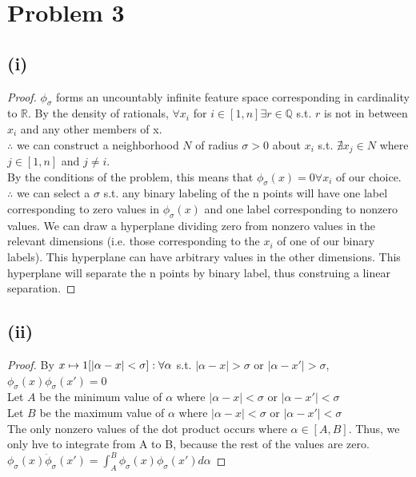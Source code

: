 \documentclass[twoside,11pt]{homework}
\begin{document}
\section*{Problem 3}
\subsection*{(i)}
	\begin{proof}
		$\phi_\sigma$ forms an uncountably infinite feature space corresponding in cardinality to $\mathbb{R}$.
		By the density of rationals, $\forall x_i$ for $i \in [1,n] \exists r \in \mathbb{Q}$
		s.t. $r$ is not in between $x_i$ and any other members of x. \\
		$\therefore$ we can construct a neighborhood $N$ of radius $\sigma > 0$ about $x_i$
		s.t. $\nexists x_j \in N$ where $j \in [1, n]$ and $j \neq i$. \\
		By the conditions of the problem, this means that $\phi_\sigma (x) = 0 \forall x_i$ of our choice. \\
		$\therefore$ we can select a $\sigma$ s.t. any binary labeling of the n points will have one label corresponding to zero values in $\phi_\sigma(x)$ and one label corresponding to nonzero values. We can draw a hyperplane dividing zero from nonzero values in the relevant dimensions (i.e. those corresponding to the $x_i$ of one of our binary labels). This hyperplane can have arbitrary values in the other dimensions. This hyperplane will separate the n points by binary label, thus construing a linear separation.
	\end{proof}

\subsection*{(ii)}
	\begin{proof}
		By $x \mapsto 1[|\alpha-x| < \sigma]:\\
		\forall \alpha$ s.t. $|\alpha - x| > \sigma $ or $|\alpha - x'| > \sigma$, $\phi_\sigma(x) \phi_\sigma(x') = 0$\\
		Let $A$ be the minimum value of $\alpha$ where $|\alpha - x| < \sigma $ or $|\alpha - x'| < \sigma$\\
		Let $B$ be the maximum value of $\alpha$ where $|\alpha - x| < \sigma $ or $|\alpha - x'| < \sigma$\\
		The only nonzero values of the dot product occurs where $\alpha \in [A, B]$.  Thus, we only hve to integrate from A to B, because the rest of the values are zero.\\
		$\phi_\sigma(x) \dot \phi_\sigma(x') = \int_{A}^{B} \phi_\sigma(x) \phi_\sigma(x') d\alpha$
	\end{proof}
\end{document}
